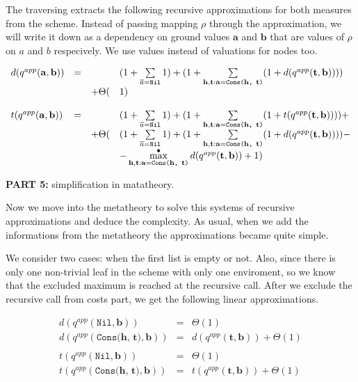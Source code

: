 The traversing extracts the following recursive approximations for both measures from the scheme. Instead of passing mapping $\rho$ through the approximation, we will write it down as a dependency on ground values $\mathbf{a}$ and $\mathbf{b}$ that are values of $\rho$ on $a$ and $b$ respecively. We use values instead of valuations for nodes too.

\[
\begin{array}{lcll}
d(q^{app}(\mathbf{a}, \mathbf{b})) & = & & (1 + \sum\limits_{\overline{a} = \texttt{Nil}} 1) + (1 + \sum\limits_{\mathbf{h}, \mathbf{t}: \mathbf{a} = \texttt{Cons($\mathbf{h}$, $\mathbf{t}$)}} (1 + d(q^{app}(\mathbf{t}, \mathbf{b})))) \\
& & + \Theta( & 1) \\
\\
t(q^{app}(\mathbf{a}, \mathbf{b})) & = & & (1 + \sum\limits_{\overline{a} = \texttt{Nil}} 1) + (1 + \sum\limits_{\mathbf{h}, \mathbf{t}: \mathbf{a} = \texttt{Cons($\mathbf{h}$, $\mathbf{t}$)}} (1 + t(q^{app}(\mathbf{t}, \mathbf{b})))) + \\
& & + \Theta( & (1 + \sum\limits_{\overline{a} = \texttt{Nil}} 1) + (1 + \sum\limits_{\mathbf{h}, \mathbf{t}: \mathbf{a} = \texttt{Cons($\mathbf{h}$, $\mathbf{t}$)}} (1 + d(q^{app}(\mathbf{t}, \mathbf{b})))) - \\
& & &  - \max^{\bullet}\limits_{\mathbf{h}, \mathbf{t}: \mathbf{a} = \texttt{Cons($\mathbf{h}$, $\mathbf{t}$)}} d(q^{app}(\mathbf{t}, \mathbf{b})) + 1) 
\end{array}
\]


\colorbox{blue!20}{\parbox{\textwidth}{\textbf{PART 5:} simplification in matatheory.}}

Now we move into the metatheory to solve this systems of recursive approximations and deduce the complexity. As usual, when we add the informations from the metatheory the approximations became quite simple.

We consider two cases: when the first list is empty or not. Also, since there is only one non-trivial leaf in the scheme with only one enviroment, so we know that the excluded maximum is reached at the recursive call. After we exclude the recursive call from costs part, we get the following linear approximations. 

\[
\begin{array}{lcl}
d(q^{app}(\texttt{Nil}, \mathbf{b})) & = & \Theta(1) \\
d(q^{app}(\texttt{Cons($\mathbf{h}$, $\mathbf{t}$)}, \mathbf{b})) & = & d(q^{app}(\mathbf{t}, \mathbf{b})) + \Theta(1) \\
\\
t(q^{app}(\texttt{Nil}, \mathbf{b})) & = & \Theta(1) \\
t(q^{app}(\texttt{Cons($\mathbf{h}$, $\mathbf{t}$)}, \mathbf{b})) & = & t(q^{app}(\mathbf{t}, \mathbf{b})) + \Theta(1) \\
\end{array}
 \]
 
